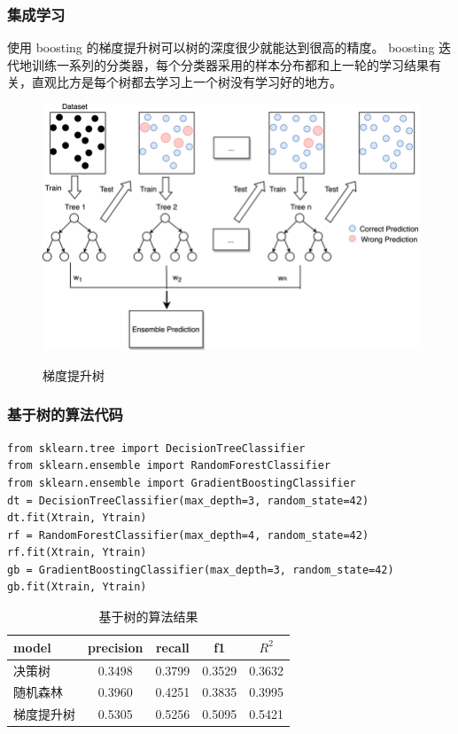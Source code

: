 \documentclass[mathserif,envcountsect,fontset=mac]{ctexbeamer}
\begin{document}
\begin{frame}
    \frametitle{集成学习}
    使用 boosting 的梯度提升树可以树的深度很少就能达到很高的精度。
    boosting 迭代地训练一系列的分类器，每个分类器采用的样本分布都和上一轮的学习结果有关，直观比方是每个树都去学习上一个树没有学习好的地方。
    \begin{center}
        \begin{figure}
            \includegraphics[width=0.6\linewidth]{../lib/boosting.png}
            \label{boosting}
            \caption{梯度提升树}
        \end{figure}
    \end{center}
\end{frame}
\begin{frame}[fragile]
    \frametitle{基于树的算法代码}
    \begin{verbatim}
from sklearn.tree import DecisionTreeClassifier
from sklearn.ensemble import RandomForestClassifier
from sklearn.ensemble import GradientBoostingClassifier
dt = DecisionTreeClassifier(max_depth=3, random_state=42)
dt.fit(Xtrain, Ytrain)
rf = RandomForestClassifier(max_depth=4, random_state=42)
rf.fit(Xtrain, Ytrain)
gb = GradientBoostingClassifier(max_depth=3, random_state=42)
gb.fit(Xtrain, Ytrain)
    \end{verbatim}
    \begin{table}
        \caption{基于树的算法结果}
        \begin{tabular}{l|cccc}
            model & precision & recall & f1     & \(R^2\) \\ \hline
            决策树   & 0.3498    & 0.3799 & 0.3529 & 0.3632  \\
            随机森林  & 0.3960    & 0.4251 & 0.3835 & 0.3995  \\
            梯度提升树 & 0.5305    & 0.5256 & 0.5095 & 0.5421  \\
        \end{tabular}
        \label{trees}
    \end{table}
\end{frame}
\end{document}
